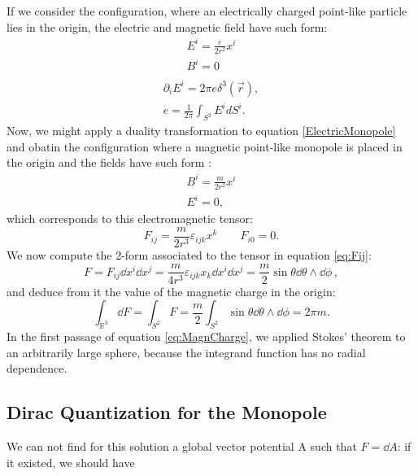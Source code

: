 \documentclass[main.tex]{subfiles}
\begin{document}
%
If we consider the configuration, where an electrically charged point-like particle lies in the origin, the electric and magnetic field have such form:
\begin{gather}\label{ElectricMonopole}
E^i=\frac{e}{2r^2}x^i \\
B^i =0\\
\end{gather}
%
%
\begin{subequations}
\begin{align}
\partial_i E^i=2\pi e \delta^3(\vec r),\\
e=\frac{1}{2\pi}\int_{S^2} E^i d S^i.
\end{align}
\end{subequations}
%
Now, we might apply a duality transformation to equation \eqref{ElectricMonopole} and obatin the configuration where a magnetic point-like monopole is placed in the origin and the fields have such form :
%
\begin{gather}
\label{MagneticMonopole}
B^i=\frac{m}{2r^2}x^i\\
E^i=0,
\end{gather}
%
which corresponds to this electromagnetic tensor:
\begin{equation}\label{eq:Fij}
F_{ij}=\frac{m}{2r^3}\varepsilon_{ijk}x^k \qquad F_{i0}=0.
\end{equation}
%
We now compute the 2-form associated to the tensor in equation \ref{eq:Fij}:
%
\begin{equation}
F=F_{ij}\dd{x^i}\dd{x^j}=\frac{m}{4r^3}\varepsilon_{ijk}x_k\dd{x^i}\dd{x^j}=\frac{m}{2}\sin\theta \dd{\theta}\wedge \dd{\phi}\,,
\end{equation}
%
and deduce from it the value of the magnetic charge in the origin:
%
\begin{equation} \label{eq:MagnCharge}
\int_{\mathbb R^3} \dd{F} = \int_{S^2} F=\frac{m}{2}\int_{S^2}\sin\theta \dd{\theta}\wedge \dd{\phi}=2\pi m .
\end{equation}
%
In the first passage of equation \ref{eq:MagnCharge}, we applied Stokes' theorem to an arbitrarily large sphere, because the integrand function has no radial dependence.

\subsection{Dirac Quantization for the Monopole}
We can not find for this solution a global vector potential A such that $F=\dd{A}$: if it existed, we should have
\end{document}
